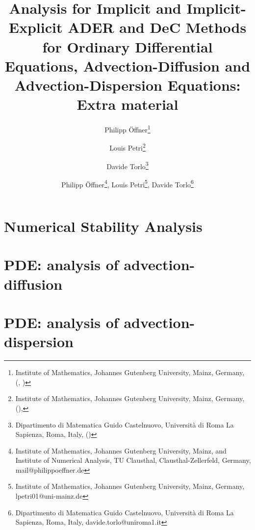 \documentclass[USenglish]{article}
\author{
	Philipp \"Offner\thanks{Institute of Mathematics, Johannes Gutenberg University, Mainz, Germany, (\email{poeffner@uni-mainz.de}, \orcid{0000-0002-1367-1917})
	} 
	\and 
	Louis Petri\thanks{Institute of Mathematics, Johannes Gutenberg University, Mainz, Germany, (\email{lpetri01@uni-mainz.de}), } 
	\and 
	Davide Torlo\thanks{Dipartimento di Matematica Guido Castelnuovo, Università di Roma La Sapienza,  Roma, Italy, (\email{davide.torlo@uniroma1.it})} 
}
\newcommand{\1}{\begin{pmatrix}
		1\\
		1
\end{pmatrix}}
\begin{document}
	\title{Analysis for Implicit and Implicit-Explicit ADER and DeC Methods for Ordinary Differential Equations, Advection-Diffusion and Advection-Dispersion Equations:\\ Extra material}
	
	\author{Philipp \"Offner\thanks{Institute of Mathematics, Johannes Gutenberg University, Mainz, and Institute of Numerical Analysis, TU Clausthal, Clausthal-Zellerfeld, Germany, mail@philippoeffner.de},
	Louis Petri\thanks{Institute of Mathematics, Johannes Gutenberg University, Mainz, Germany, lpetri01@uni-mainz.de },  
	Davide Torlo\thanks{Dipartimento di Matematica Guido Castelnuovo, Università di Roma La Sapienza,  Roma, Italy, davide.torlo@uniroma1.it}
	}
	\date{}
	\maketitle
	
%			
	
	
	
	\section{Numerical Stability Analysis}
	\label{sec: stability_analysis_ODE}
	

	\section{PDE: analysis of advection-diffusion}
	\label{sec: advection_diffusion}
	 
	
	\section{PDE: analysis of advection-dispersion}
	\label{sec:PDE_adv_disp}
	 
	
%
%	 
	

	
\end{document}
